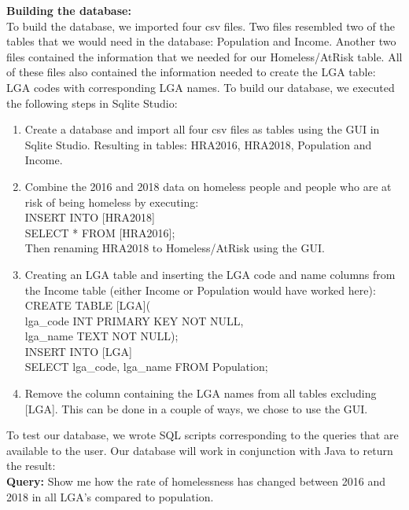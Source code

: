 \documentclass[12pt, a4paper]{article}
\begin{document}
\textbf{Building the database:} \\
To build the database, we imported four csv files. Two files resembled two of the tables that we would need in the database: Population and Income. Another two files contained the information that we needed for our Homeless/AtRisk table. All of these files also contained the information needed to create the LGA table: LGA codes with corresponding LGA names. To build our database, we executed the following steps in Sqlite Studio:

\begin{enumerate}
\item Create a database and import all four csv files as tables using the GUI in Sqlite Studio. Resulting in tables: HRA2016, HRA2018, Population and Income.
\item Combine the 2016 and 2018 data on homeless people and people who are at risk of being homeless by executing: \\
\hspace*{10mm}%
INSERT INTO [HRA2018]\\
\hspace*{10mm}%
SELECT * FROM [HRA2016];\\
Then renaming HRA2018 to Homeless/AtRisk using the GUI.
\item Creating an LGA table and inserting the LGA code and name columns from the Income table (either Income or Population would have worked here):\\
\hspace*{10mm}%
CREATE TABLE [LGA](\\
\hspace*{10mm}%
lga\_code INT PRIMARY KEY NOT NULL,\\
\hspace*{10mm}%
lga\_name TEXT NOT NULL);\\
\hspace*{10mm}%
INSERT INTO [LGA]\\
\hspace*{10mm}%
SELECT lga\_code, lga\_name FROM Population;
\item Remove the column containing the LGA names from all tables excluding [LGA]. This can be done in a couple of ways, we chose to use the GUI.
\end{enumerate}
To test our database, we wrote SQL scripts corresponding to the queries that are available to the user. Our database will work in conjunction with Java to return the result: \\
\textbf{Query:} Show me how the rate of homelessness has changed between 2016 and 2018 in all LGA's compared to population.\\
\end{document}
